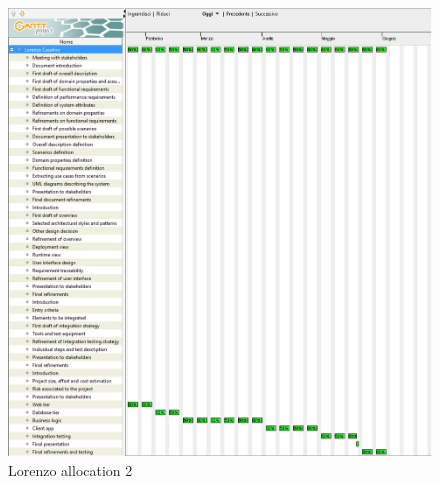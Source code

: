 \begin{figure}[H]
	\centerline{
		\includegraphics[width=500px]{../Datas/images/resource-lorenzo-2.png}
	}
	\caption{Lorenzo allocation 2}
		\label{fig:tasks-1}
\end{figure}
